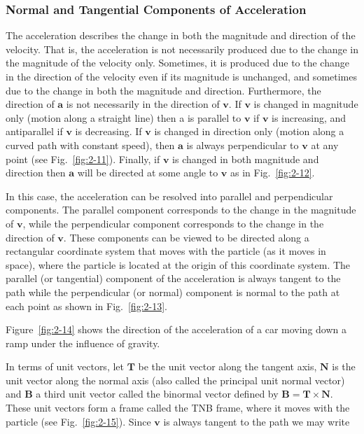 \documentclass[10pt]{article}
\numberwithin{equation}{section}
\begin{document}
\subsubsection{Normal and Tangential Components of Acceleration}\label{sec:2-3-1}
The acceleration describes the change in both the magnitude and direction of the velocity. That is, the acceleration is not necessarily produced due to the change in the magnitude of the velocity only. Sometimes, it is produced due to the change in the direction of the velocity even if its magnitude is unchanged, and sometimes due to the change in both the magnitude and direction. Furthermore, the direction of $\mathbf{a}$ is not necessarily in the direction of $\mathbf{v}$. If $\mathbf{v}$ is changed in magnitude only (motion along a straight line) then a is parallel to $\mathbf{v}$ if $\mathbf{v}$ is increasing, and antiparallel if $\mathbf{v}$ is decreasing. If $\mathbf{v}$ is changed in direction only (motion along a curved path with constant speed), then $\mathbf{a}$ is always perpendicular to $\mathbf{v}$ at any point (see Fig.~\ref{fig:2-11}). Finally, if $\mathbf{v}$ is changed in both magnitude and direction then $\mathbf{a}$ will be directed at some angle to $\mathbf{v}$ as in Fig.~\ref{fig:2-12}.

In this case, the acceleration can be resolved into parallel and perpendicular components. The parallel component corresponds to the change in the magnitude of $\mathbf{v}$, while the perpendicular component corresponds to the change in the direction of $\mathbf{v}$. These components can be viewed to be directed along a rectangular coordinate system that moves with the particle (as it moves in space), where the particle is located at the origin of this coordinate system. The parallel (or tangential) component of the acceleration is always tangent to the path while the perpendicular (or normal) component is normal to the path at each point as shown in Fig.~\ref{fig:2-13}.

Figure~\ref{fig:2-14} shows the direction of the acceleration of a car moving down a ramp under the influence of gravity.

In terms of unit vectors, let $\mathbf{T}$ be the unit vector along the tangent axis, $\mathbf{N}$ is the unit vector along the normal axis (also called the principal unit normal vector) and $\mathbf{B}$ a third unit vector called the binormal vector defined by $\mathbf{B}=\mathbf{T} \times \mathbf{N}$. These unit vectors form a frame called the TNB frame, where it moves with the particle (see Fig.~\ref{fig:2-15}). Since $\mathbf{v}$ is always tangent to the path we may write
\end{document}
